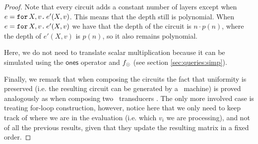 \begin{proof}
Note that every circuit adds a constant number of layers except when $e=\texttt{for}\, X,v \texttt{.}\, e'(X, v)$. 
This means that the depth still is polynomial. When $e=\texttt{for}\, X,v \texttt{.}\, e'(X, v)$
we have that the depth of the circuit is $n\cdot p(n)$, where the depth of $e'(X, v)$ is $p(n)$, 
so it also remains polynomial.

Here, we do not need to translate scalar multiplication
because it can be simulated using the $\mathsf{ones}$ operator and $f_{\odot}$ (see section \ref{sec:queries:simp}).

Finally, we remark that when composing the circuits the fact that uniformity is preserved (i.e. the resulting circuit can be generated by a \logspace\ machine) is proved analogously as when composing two \logspace\ transducers \cite{aroraB2009}. The only more involved case is treating for-loop construction, however, notice here that we only need to keep track of where we are in the evaluation (i.e. which $v_i$ we are processing), and not of all the previous results, given that they update the resulting matrix in a fixed order.

\end{proof}





